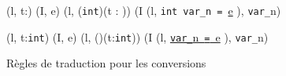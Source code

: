 \begin{figure*}[h!]
  \scriptsize{
    {
      {(l, t:) \trule (I, e)}
      {
        (l, (\mbox{\lstinline'int'})(t : )) \trule
        (I \concat (l,
        \mbox{\lstinline'int var_n ='}~\underline{e\Zclear}
        \semicolon
        ), \mbox{\lstinline'var_'}n)
      }{}
    }

    {
      {(l, t:\mbox{\lstinline'int'}) \trule (I, e)}
      {(l, ()(t:\mbox{\lstinline'int'})) \trule (I \concat (l,
        \underline{\Zinit \mbox{\lstinline'var_'}n~\mbox{\lstinline'='}~e}
        \semicolon
        ), \mbox{\lstinline'var_'}n)}{}
    }
  }
  \caption{Règles de traduction pour les conversions}
  \label{fig:coerce}
\end{figure*}
